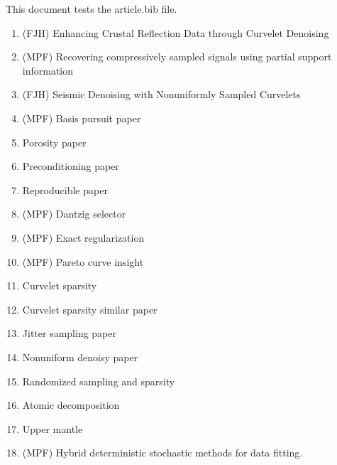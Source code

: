 \documentclass[11 pt]{amsart}
\begin{document}
This document tests the article.bib file. 

\begin{enumerate}

\item (FJH) Enhancing Crustal Reflection Data through Curvelet Denoising~\cite{kumar10TNPecr}

\item (MPF) Recovering compressively sampled signals using partial support information~\cite{mansour11TRrcs}

\item (FJH) Seismic Denoising with Nonuniformly Sampled Curvelets~\cite{hennenfent06CiSEsdn}


\item (MPF) Basis pursuit paper~\cite{BergFriedlander:2008}

\item Porosity paper~\cite{bernabe04JGRpas}

\item Preconditioning paper~\cite{Erlangga07ETNAoam}

\item Reproducible paper~\cite{fomel07rce}

\item (MPF) Dantzig selector~\cite{friedlander07dtd}

\item (MPF) Exact regularization~\cite{friedlander07ero}

\item (MPF) Pareto curve insight~\cite{hennenfent08GEOnii}

\item Curvelet sparsity~\cite{hennenfent10nct}

\item Curvelet sparsity similar paper~\cite{hennenfent:WB203}

\item Jitter sampling paper~\cite{hennenfent08GEOsdw}

\item Nonuniform denoisy paper~\cite{hennenfent06sdw}

\item Randomized sampling and sparsity~\cite{herrmann10rsg}

\item Atomic decomposition~\cite{herrmann05sdb}

\item Upper mantle~\cite{herrmann04ssa}

\item (MPF) Hybrid deterministic stochastic methods for data fitting.~\cite{friedlander11hybrid}


\end{enumerate}
\end{document}
